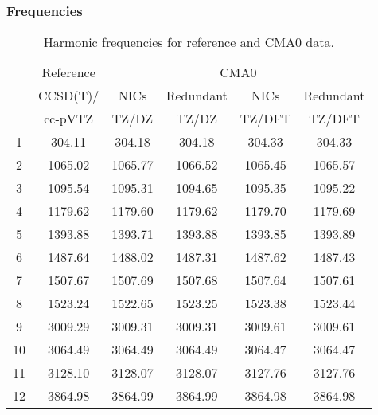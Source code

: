 \documentclass[10pt,oneside]{article}
\begin{document}
\begin{table}[h!]
\subsubsection*{Frequencies}
\centering
\caption{Harmonic frequencies for reference and CMA0 data.}
\begin{tabular}{cccccc}
\toprule
{} & Reference & \multicolumn{4}{c}{CMA0} \\
{} &  CCSD(T)/ &    NICs &  Redundant &    NICs & Redundant \\
{} &   cc-pVTZ &   TZ/DZ &      TZ/DZ &  TZ/DFT &    TZ/DFT \\
\midrule
1  &    304.11 &  304.18 &     304.18 &  304.33 &    304.33 \\
2  &   1065.02 & 1065.77 &    1066.52 & 1065.45 &   1065.57 \\
3  &   1095.54 & 1095.31 &    1094.65 & 1095.35 &   1095.22 \\
4  &   1179.62 & 1179.60 &    1179.62 & 1179.70 &   1179.69 \\
5  &   1393.88 & 1393.71 &    1393.88 & 1393.85 &   1393.89 \\
6  &   1487.64 & 1488.02 &    1487.31 & 1487.62 &   1487.43 \\
7  &   1507.67 & 1507.69 &    1507.68 & 1507.64 &   1507.61 \\
8  &   1523.24 & 1522.65 &    1523.25 & 1523.38 &   1523.44 \\
9  &   3009.29 & 3009.31 &    3009.31 & 3009.61 &   3009.61 \\
10 &   3064.49 & 3064.49 &    3064.49 & 3064.47 &   3064.47 \\
11 &   3128.10 & 3128.07 &    3128.07 & 3127.76 &   3127.76 \\
12 &   3864.98 & 3864.99 &    3864.99 & 3864.98 &   3864.98 \\
\bottomrule
\end{tabular}
\end{table}
\end{document}

